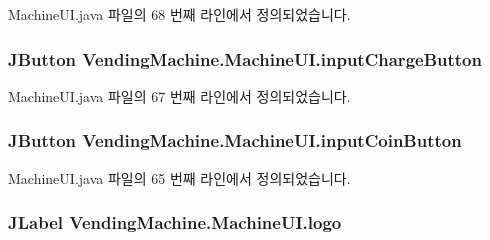 Machine\+U\+I.\+java 파일의 68 번째 라인에서 정의되었습니다.

\subsubsection[{\texorpdfstring{input\+Charge\+Button}{inputChargeButton}}]{\setlength{\rightskip}{0pt plus 5cm}J\+Button Vending\+Machine.\+Machine\+U\+I.\+input\+Charge\+Button\hspace{0.3cm}{\ttfamily [private]}}\hypertarget{class_vending_machine_1_1_machine_u_i_af087897ffa9ab50127ab87daf7fb072f}{}\label{class_vending_machine_1_1_machine_u_i_af087897ffa9ab50127ab87daf7fb072f}


Machine\+U\+I.\+java 파일의 67 번째 라인에서 정의되었습니다.

\subsubsection[{\texorpdfstring{input\+Coin\+Button}{inputCoinButton}}]{\setlength{\rightskip}{0pt plus 5cm}J\+Button Vending\+Machine.\+Machine\+U\+I.\+input\+Coin\+Button\hspace{0.3cm}{\ttfamily [private]}}\hypertarget{class_vending_machine_1_1_machine_u_i_a51a3894dfa3129ad9f4e385395499cc9}{}\label{class_vending_machine_1_1_machine_u_i_a51a3894dfa3129ad9f4e385395499cc9}


Machine\+U\+I.\+java 파일의 65 번째 라인에서 정의되었습니다.

\subsubsection[{\texorpdfstring{logo}{logo}}]{\setlength{\rightskip}{0pt plus 5cm}J\+Label Vending\+Machine.\+Machine\+U\+I.\+logo\hspace{0.3cm}{\ttfamily [private]}}\hypertarget{class_vending_machine_1_1_machine_u_i_af470215213c1133a4f2549d0a00b5d16}{}\label{class_vending_machine_1_1_machine_u_i_af470215213c1133a4f2549d0a00b5d16}


